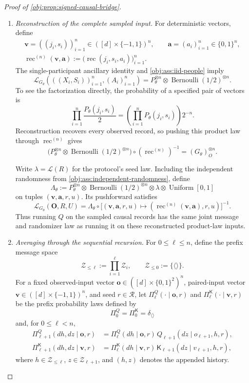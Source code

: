 \documentclass[11pt]{article}
\begin{document}
\begin{proof}[Proof of \cref{obj:prop:signed-causal-bridge}]
\begin{enumerate}
\item \emph{Reconstruction of the complete sampled input.}
For deterministic vectors, define
\[
\begin{gathered}
\mathbf v=((j_i,s_i))_{i=1}^n
\in([d]\times\{-1,1\})^n,
\qquad
\mathbf a=(a_i)_{i=1}^n\in\{0,1\}^n,\\
\operatorname{rec}^{(n)}(\mathbf v,\mathbf a)
:=\bigl(\operatorname{rec}(j_i,s_i,a_i)\bigr)_{i=1}^n.
\end{gathered}
\]
The single-participant ancillary identity and
\cref{obj:ass:iid-people} imply
\[
\mathcal L_{G_\theta}\!\left(
((X_i,S_i))_{i=1}^n,(A_i)_{i=1}^n\right)
=P_\theta^{\otimes n}
 \otimes\operatorname{Bernoulli}(1/2)^{\otimes n}.
\]
To see the factorization directly, the probability of a specified pair
of vectors is
\[
\prod_{i=1}^n\frac{P_\theta(j_i,s_i)}2
=\left(\prod_{i=1}^nP_\theta(j_i,s_i)\right)2^{-n}.
\]
Reconstruction recovers every observed record, so pushing this product
law through \(\operatorname{rec}^{(n)}\) gives
\[
\bigl(P_\theta^{\otimes n}
 \otimes\operatorname{Bernoulli}(1/2)^{\otimes n}\bigr)
 \circ(\operatorname{rec}^{(n)})^{-1}
=(G_\theta)_O^{\otimes n}.
\]

Write \(\lambda=\mathcal L(R)\) for the protocol's seed law. Including
the independent randomness from
\cref{obj:ass:independent-randomness}, define
\[
\Lambda_\theta
:=P_\theta^{\otimes n}
 \otimes\operatorname{Bernoulli}(1/2)^{\otimes n}
 \otimes\lambda\otimes\operatorname{Uniform}[0,1]
\]
on tuples \((\mathbf v,\mathbf a,r,u)\). Its pushforward satisfies
\[
\mathcal L_{G_\theta}(\mathbf O,R,U)
=\Lambda_\theta\circ
\bigl[(\mathbf v,\mathbf a,r,u)
\mapsto(\operatorname{rec}^{(n)}(\mathbf v,\mathbf a),r,u)\bigr]^{-1}.
\]
Thus running \(Q\) on the sampled causal records has the same joint
message and randomizer law as running it on these reconstructed
product-law inputs.

\item \emph{Averaging through the sequential recursion.}
For \(0\le\ell\le n\), define the prefix message space
\[
\mathcal Z_{\le\ell}:=\prod_{i=1}^{\ell}\mathcal Z_i,
\qquad
\mathcal Z_{\le0}:=\{\langle\rangle\}.
\]
For a fixed observed-input vector
\(\mathbf o\in([d]\times\{0,1\}^2)^n\), paired-input vector
\(\mathbf v\in([d]\times\{-1,1\})^n\), and seed \(r\in\mathcal R\),
let \(\Pi_\ell^Q(\cdot\mid\mathbf o,r)\) and
\(\Pi_\ell^{\mathsf K}(\cdot\mid\mathbf v,r)\) be the prefix probability
laws defined by
\[
\Pi_0^Q=\Pi_0^{\mathsf K}=\delta_{\langle\rangle}
\]
and, for \(0\le\ell<n\),
\[
\begin{aligned}
\Pi_{\ell+1}^Q(dh,dz\mid\mathbf o,r)
&=\Pi_\ell^Q(dh\mid\mathbf o,r)\,
 Q_{\ell+1}(dz\mid o_{\ell+1},h,r),\\
\Pi_{\ell+1}^{\mathsf K}(dh,dz\mid\mathbf v,r)
&=\Pi_\ell^{\mathsf K}(dh\mid\mathbf v,r)\,
 \mathsf K_{\ell+1}(dz\mid v_{\ell+1},h,r),
\end{aligned}
\]
where \(h\in\mathcal Z_{\le\ell}\), \(z\in\mathcal Z_{\ell+1}\), and
\((h,z)\) denotes the appended history.


\end{enumerate}
\end{proof}
\end{document}
